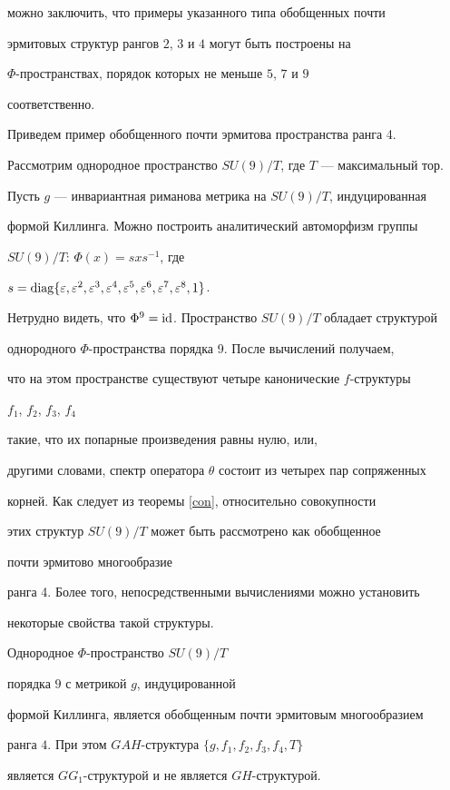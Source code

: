 можно заключить, что примеры указанного типа обобщенных почти


эрмитовых структур рангов $2$, $3$ и $4$ могут быть построены на


$\Phi$-пространствах, порядок которых не меньше $5$, $7$ и $9$


соответственно.





Приведем пример обобщенного почти эрмитова пространства ранга 4.


Рассмотрим однородное пространство $SU(9)/T$, где $T$ --- максимальный тор.


Пусть $g$ --- инвариантная риманова метрика на $SU(9)/T$, индуцированная


формой Киллинга. Можно построить аналитический автоморфизм группы


$SU(9)/T$: $\Phi(x)=sxs^{-1}$, где


$s=\diag\{\varepsilon,\varepsilon^2,\varepsilon^3,\varepsilon^4,


\varepsilon^5,\varepsilon^6,\varepsilon^7,\varepsilon^8,1\}$.


Нетрудно видеть, что $\Phi^9=\operatorname{id}$. Пространство $SU(9)/T$ обладает структурой


однородного $\Phi$-пространства порядка 9. После вычислений получаем,


что на этом пространстве существуют четыре канонические $f$-структуры


$f_1$, $f_2$, $f_3$, $f_4$


такие, что их попарные произведения равны нулю, или,


другими словами, спектр оператора $\theta$ состоит из четырех пар сопряженных


корней. Как следует из теоремы \ref{con}, относительно совокупности


этих структур $SU(9)/T$ может быть рассмотрено как обобщенное


почти эрмитово многообразие


ранга 4. Более того, непосредственными вычислениями можно установить


некоторые свойства такой структуры.





\begin{thm}\label{thm11}


Однородное $\Phi$-пространство $SU(9)/T$


порядка $9$ с метрикой $g$, индуцированной


формой Киллинга, является обобщенным почти эрмитовым многообразием


ранга $4$. При этом $GAH$-структура $\{g,f_1,f_2,f_3,f_4,T\}$


является $GG_1$-структурой и не является $GH$-структурой.


\end{thm}





